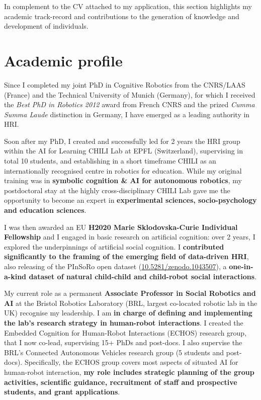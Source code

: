
In complement to the CV attached to my application, this section highlights my
academic track-record and contributions to the generation of knowledge and
development of individuals.

\section{Academic profile}\label{early-achievements-track-record}


Since I completed my joint PhD in Cognitive Robotics from the CNRS/LAAS (France) and the
Technical University of Munich (Germany), for which I received the \emph{Best
PhD in Robotics 2012} award from French CNRS and the prized \emph{Cumma Summa
Laude} distinction in Germany, I have emerged as a leading authority in
HRI.

Soon after my PhD, I created and successfully led for 2 years the HRI group
within the AI for Learning CHILI Lab at EPFL (Switzerland), supervising in total
10 students, and establishing in a short timeframe CHILI as an internationally
recognised centre in robotics for education. While my original training was in
\textbf{symbolic cognition \& AI for autonomous robotics}, my postdoctoral stay
at the highly cross-disciplinary CHILI Lab gave me the opportunity to become an
expert in \textbf{experimental sciences, socio-psychology and education
sciences}.

I was then awarded an EU \textbf{H2020 Marie Sklodovska-Curie Individual
Fellowship} and I engaged in basic research on artificial cognition: over 2
years, I explored the underpinnings of artificial social cognition. I
\textbf{contributed significantly to the framing of the emerging field of
data-driven HRI}, also releasing of the PInSoRo open dataset
(\href{https://doi.org/10.5281/zenodo.1043507}{10.5281/zenodo.1043507}), a
\textbf{one-in-a-kind dataset of natural child-child and child-robot social
interactions}.

My current role as a permanent \textbf{Associate Professor in Social Robotics
and AI} at the Bristol Robotics Laboratory (BRL, largest co-located robotic lab
in the UK) recognise my leadership. I am \textbf{in charge of defining and
implementing the lab's research strategy in human-robot interactions}. I created
the Embedded Cognition for Human-Robot Interactions (ECHOS) research group, that
I now co-lead, supervising 15+ PhDs and post-docs. I also supervise the BRL's
Connected Autonomous Vehicles research group (5 students and post-docs).
Specifically, the ECHOS group covers most aspects of situated AI for human-robot
interaction, \textbf{my role includes strategic planning of the group
activities, scientific guidance, recruitment of staff and prospective students,
and grant applications}.

